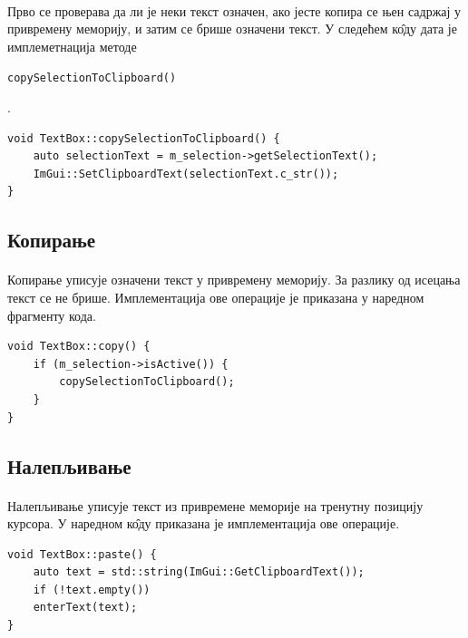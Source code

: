\documentclass[12pt,oneside]{memoir}
\begin{document}
\paragraph{}
Прво се проверава да ли је неки текст означен, ако јесте копира се њен садржај у
привремену меморију, и затим се брише означени текст. У следећем к\^{о}ду дата је имплеметнација
методе \begin{latinica}\verb|copySelectionToClipboard()|\end{latinica}.

\begin{verbatim}
void TextBox::copySelectionToClipboard() {
	auto selectionText = m_selection->getSelectionText();
	ImGui::SetClipboardText(selectionText.c_str());
}
\end{verbatim}

\subsection{Копирање}
\paragraph{}
Копирање уписује означени текст у привремену меморију. За разлику од исецања текст 
се не брише. Имплементација ове операције је приказана у наредном фрагменту кода.

\begin{verbatim}
void TextBox::copy() {
	if (m_selection->isActive()) {
		copySelectionToClipboard();
	}
}
\end{verbatim}

\subsection{Налепљивање}
\paragraph{}
Налепљивање уписује текст из привремене меморије на тренутну позицију курсора. 
У наредном к\^{о}ду приказана је имплементација ове операције.

\begin{verbatim}
void TextBox::paste() {
	auto text = std::string(ImGui::GetClipboardText());
	if (!text.empty())
	enterText(text);
}
\end{verbatim}


\end{document}
